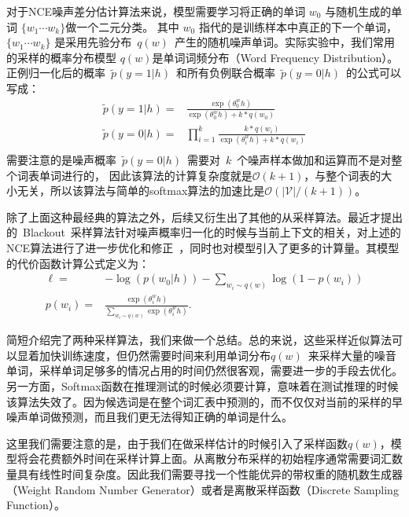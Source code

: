 对于NCE噪声差分估计算法来说，模型需要学习将正确的单词 $w_0$ 与随机生成的单词 $\{w_1\cdots w_k\}$做一个二元分类。 其中 $w_0$ 指代的是训练样本中真正的下一个单词， $\{w_1\cdots w_k\}$ 是采用先验分布~$q(w)$~产生的随机噪声单词。实际实验中，我们常用的采样的概率分布模型 $q(w)$是单词词频分布（Word Frequency Distribution）。 正例归一化后的概率~$\tilde{p}(y=1|h)$~和所有负例联合概率~$\tilde{p}(y=0|h)$~的公式可以写成：
\begin{equation}\label{equ:nce}
\begin{split}
  \tilde{p}(y=1|h)=&\frac{\exp( \theta^w_0 h)}{ \exp( \theta^w_0 h)+k *q(w_0)}\\
  \tilde{p}(y=0|h)=&\prod_{i=1}^{k}\frac{k *q(w_i)}{\exp( \theta^w_i h)+k *q(w_i)}\\
\end{split}
\end{equation}
需要注意的是噪声概率~$\tilde{p}(y=0|h)$~需要对~$k$~个噪声样本做加和运算而不是对整个词表单词进行的， 因此该算法的计算复杂度就是$\mathcal{O}(k+1)$，与整个词表的大小无关，所以该算法与简单的softmax算法的加速比是$\mathcal{O}(\mathcal{|V|}/(k+1))$。

除了上面这种最经典的算法之外，后续又衍生出了其他的从采样算法。最近才提出的~Blackout~采样算法针对噪声概率归一化的时候与当前上下文的相关，对上述的NCE算法进行了进一步优化和修正~，同时也对模型引入了更多的计算量。其模型的代价函数计算公式定义为：
\begin{equation}
\begin{split}
  \ell=&-\log(p(w_0|h)) - \sum_{w_i \sim q(w)} \log(1 - p(w_i))\\
p(w_i) =& \frac{\exp(\theta^w_i h)}{\sum_{w_i \sim q(w)} \exp(\theta^w_i h)}.
\end{split}
\end{equation}

简短介绍完了两种采样算法，我们来做一个总结。总的来说，这些采样近似算法可以显着加快训练速度，但仍然需要时间来利用单词分布$q(w)$~来采样大量的噪音单词，采样单词足够多的情况占用的时间仍然很客观，需要进一步的手段去优化。 另一方面，Softmax函数在推理测试的时候必须要计算，意味着在测试推理的时候该算法失效了。因为候选词是在整个词汇表中预测的，而不仅仅对当前的采样的早噪声单词做预测，而且我们更无法得知正确的单词是什么。

这里我们需要注意的是，由于我们在做采样估计的时候引入了采样函数$q(w)$，模型将会花费额外时间在采样计算上面。从离散分布采样的初始程序通常需要词汇数量具有线性时间复杂度。因此我们需要寻找一个性能优异的带权重的随机数生成器（Weight Random Number Generator）或者是离散采样函数（Discrete Sampling Function）。



